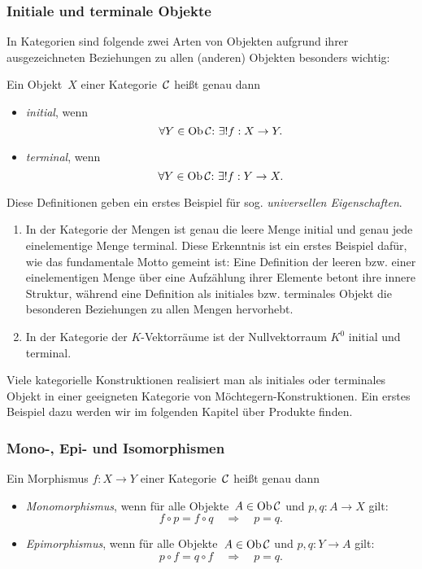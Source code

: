 \subsubsection*{Initiale und terminale Objekte}

In Kategorien sind folgende zwei Arten von Objekten aufgrund ihrer
ausgezeichneten Beziehungen zu allen (anderen) Objekten besonders wichtig:
\begin{defn}
Ein Objekt~$X$ einer Kategorie~$\mathcal{C}$ heißt genau dann
\begin{itemize}
  \item \emph{initial}, wenn
    \[ \forall Y \in \operatorname{Ob} \mathcal{C}{:}\ \exists! f : X \to Y. \]
  \item \emph{terminal}, wenn
    \[ \forall Y \in \operatorname{Ob} \mathcal{C}{:}\ \exists! f : Y \to X. \]
\end{itemize}
\end{defn}
Diese Definitionen geben ein erstes Beispiel für sog. \emph{universellen
Eigenschaften}.

\begin{bsp}\begin{enumerate}
\item In der Kategorie der Mengen ist genau die leere Menge initial und
genau jede einelementige Menge terminal. Diese Erkenntnis ist ein erstes
Beispiel dafür, wie das fundamentale Motto gemeint ist: Eine Definition der
leeren bzw. einer einelementigen Menge über eine Aufzählung ihrer Elemente
betont ihre innere Struktur, während eine Definition als initiales bzw.
terminales Objekt die besonderen Beziehungen zu allen Mengen hervorhebt.
\item In der Kategorie der $K$-Vektorräume ist der Nullvektorraum $K^0$ initial
und terminal.
\end{enumerate}\end{bsp}
Viele kategorielle Konstruktionen realisiert man als initiales oder
terminales Objekt in einer geeigneten Kategorie von Möchtegern-Konstruktionen.
Ein erstes Beispiel dazu werden wir im folgenden Kapitel über Produkte finden.


\subsubsection*{Mono-, Epi- und Isomorphismen}

\begin{defn}
Ein Morphismus $f:X \to Y$ einer Kategorie~$\mathcal{C}$ heißt genau dann
\begin{itemize}
  \item \emph{Monomorphismus}, \tabto{3.35cm}wenn für alle Objekte~$A \in \operatorname{Ob} \mathcal{C}$
  und $p,q:A \to X$ gilt:
  \[ f \circ p = f \circ q \quad\Longrightarrow\quad p = q. \]
  \item \emph{Epimorphismus}, \tabto{3.35cm}wenn für alle Objekte~$A \in \operatorname{Ob} \mathcal{C}$
  und $p,q:Y \to A$ gilt:
  \[ p \circ f = q \circ f \quad\Longrightarrow\quad p = q. \]
\end{itemize}
\end{defn}

